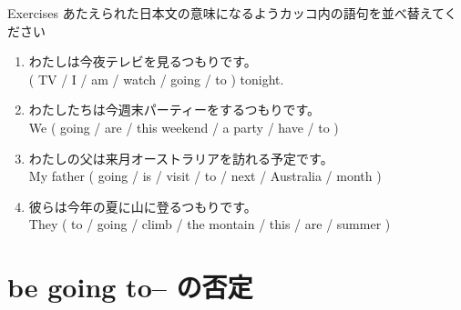\documentclass[aspectratio=169,xcolor={dvipsnames,table}]{beamer}
\newcommand{\myaudio}[1]{\href{#1}{\faVolumeUp}}
\begin{document}
\begin{frame}[plain]{Exercises}
 あたえられた日本文の意味になるようカッコ内の語句を並べ替えてください\hfill\myaudio{./audio/011_be_going_to_02.mp3}


\begin{enumerate}
 \item わたしは今夜テレビを見るつもりです。\\
( TV / I / am / watch / going / to ) tonight.\\
 \item わたしたちは今週末パーティーをするつもりです。\\
We ( going / are / this weekend / a party / have / to )\\
 \item わたしの父は来月オーストラリアを訪れる予定です。\\
My father ( going / is / visit / to / next / Australia / month )\\
 \item 彼らは今年の夏に山に登るつもりです。\\
They ( to / going / climb / the montain / this / are / summer )\\
\end{enumerate}
\end{frame}

\section{be going to-- の否定}
\end{document}
